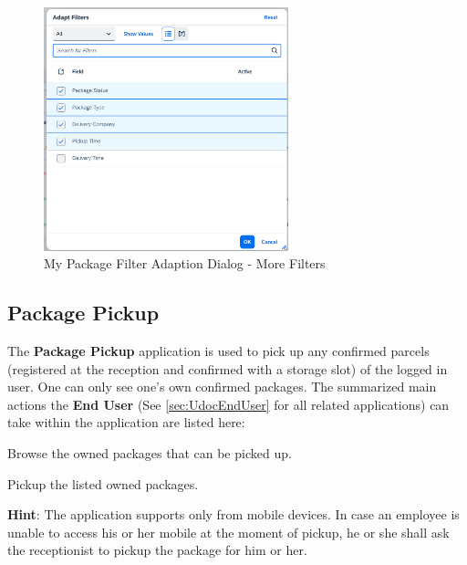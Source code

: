 \begin{figure}[H]
	\centering
	\includegraphics[height=200pt]{images/user_doc/myPack/MoreFIlterOption.png}
	\caption{My Package Filter Adaption Dialog - More Filters}
	\label{fig:mpMOreFilterAdaption}
\end{figure}
% 

\subsection{Package Pickup}
\label{subsec:pp}

The \textbf{Package Pickup} application is used to pick up any confirmed parcels (registered at the reception and confirmed with a storage slot) of the logged in user. One can only see one's own confirmed packages. 
The summarized main actions the \textbf{End User} (See \autoref{sec:UdocEndUser} for all related applications) can take within the application are listed here:

\begin{compactenum}
	\item Browse the owned packages that can be picked up.
    \item Pickup the listed owned packages.
\end{compactenum}

\bigskip
\textbf{Hint}: The application supports only from mobile devices. In case an employee is unable to access his or her mobile at the moment of pickup, he or she shall ask the receptionist to pickup the package for him or her.


